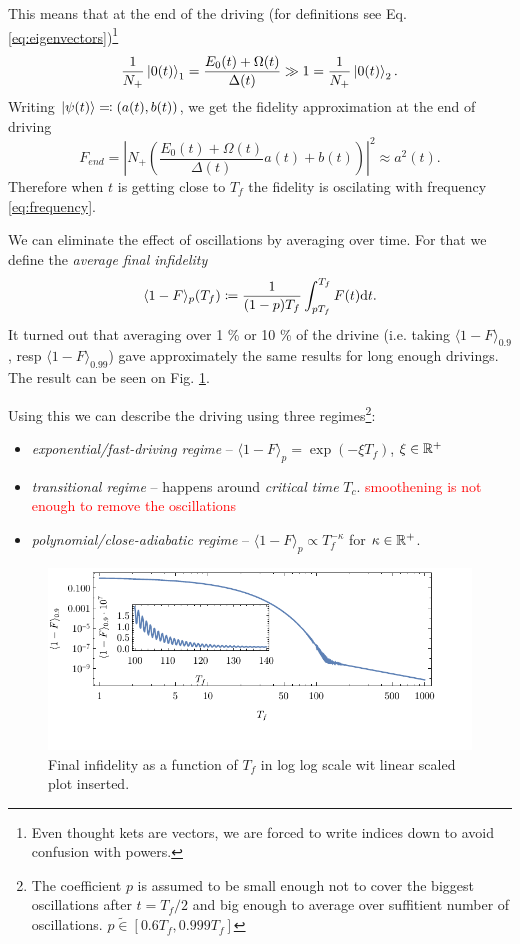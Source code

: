 This means that at the end of the driving (for definitions see Eq. \ref{eq:eigenvectors})\footnote{Even thought kets are vectors, we are forced to write indices down to avoid confusion with powers.}
\begin{equation}
   \frac{1}{N_+} \ket{0(t)}_1=\frac{E_0(t)+\Omega(t)}{\Delta(t)}\gg 1 =\frac{1}{N_+} \ket{0(t)}_2.
\end{equation}
Writing $\ket{\psi(t)}\eqqcolon (a(t),b(t))$, we get the fidelity approximation at the end of driving
\begin{equation}
    F_{end}= \left|N_+ \left(
        \frac{E_0(t)+\Omega(t)}{\Delta(t)} a(t)+b(t)
        \right)\right|^2 \approx a^2(t).
\end{equation}
Therefore when $t$ is getting close to $T_f$ the fidelity is oscilating with frequency \ref{eq:frequency}.


We can eliminate the effect of oscillations by averaging over time. For that we define the \emph{average final infidelity}
\begin{equation}
    \langle 1-F\rangle_p(T_f) \coloneqq \frac{1}{(1-p) T_f}\int_{p T_f}^{T_f} F(t)\mathrm{d} t.
\end{equation}
It turned out that averaging over 1 \% or 10 \% of the drivine (i.e. taking $\langle 1-F\rangle_{0.9}$, resp $\langle 1-F\rangle_{0.99}$) gave approximately the same results for long enough drivings. The result can be seen on Fig. \ref{fig:infidCombined}.

Using this we can describe the driving using three regimes\footnote{The coefficient $p$ is assumed to be small enough not to cover the biggest oscillations after $t=T_f/2$ and big enough to average over suffitient number of oscillations. $p\tilde\in[0.6T_f,0.999T_f]$}:
\begin{itemize}
    \item \emph{exponential/fast-driving regime} -- $\langle 1-F\rangle_p= \exp(-\xi T_f)$, $\xi\in\mathbb{R}^+$
    \item \emph{transitional regime} -- happens around \emph{critical time} $T_c$. \textcolor{red}{smoothening is not enough to remove the oscillations}
    \item \emph{polynomial/close-adiabatic regime} -- $\langle 1-F\rangle_p\propto T_f^{-\kappa}$ for $\kappa\in \mathbb{R}^+$.
\end{itemize}

\begin{figure}[H]
    \centering
    \includegraphics[scale=1.2]{../img/infidCombined1.pdf}
    \caption{Final infidelity as a function of $T_f$ in log log scale wit linear scaled plot inserted.}
    \label{fig:infidCombined}
\end{figure}


